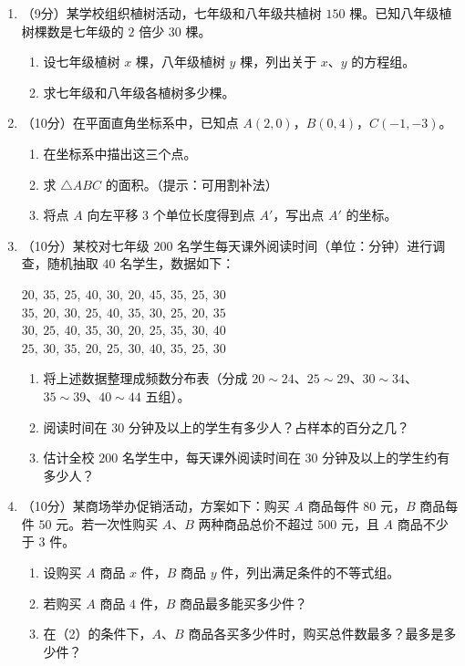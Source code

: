 \documentclass[12pt, a4paper]{ctexart}
\begin{document}
\begin{enumerate}[label=\textbf{\arabic*.}, leftmargin=2.5em, resume]
\item （9分）某学校组织植树活动，七年级和八年级共植树 $150$ 棵。已知八年级植树棵数是七年级的 $2$ 倍少 $30$ 棵。
\begin{enumerate}[label=(\arabic*), nosep]
\item 设七年级植树 $x$ 棵，八年级植树 $y$ 棵，列出关于 $x$、$y$ 的方程组。
\item 求七年级和八年级各植树多少棵。
\end{enumerate}
\vspace{6cm}

\item （10分）在平面直角坐标系中，已知点 $A(2, 0)$，$B(0, 4)$，$C(-1, -3)$。
\begin{enumerate}[label=(\arabic*), nosep]
\item 在坐标系中描出这三个点。
\item 求 $\triangle ABC$ 的面积。（提示：可用割补法）
\item 将点 $A$ 向左平移 $3$ 个单位长度得到点 $A'$，写出点 $A'$ 的坐标。
\end{enumerate}
\vspace{6cm}

\item （10分）某校对七年级 $200$ 名学生每天课外阅读时间（单位：分钟）进行调查，随机抽取 $40$ 名学生，数据如下：

\begin{center}
$20,\ 35,\ 25,\ 40,\ 30,\ 20,\ 45,\ 35,\ 25,\ 30$\\
$35,\ 20,\ 30,\ 25,\ 40,\ 35,\ 30,\ 25,\ 20,\ 35$\\
$30,\ 25,\ 40,\ 35,\ 30,\ 20,\ 25,\ 35,\ 30,\ 40$\\
$25,\ 30,\ 35,\ 20,\ 25,\ 30,\ 40,\ 35,\ 25,\ 30$
\end{center}

\begin{enumerate}[label=(\arabic*), nosep]
\item 将上述数据整理成频数分布表（分成 $20\sim24$、$25\sim29$、$30\sim34$、$35\sim39$、$40\sim44$ 五组）。
\item 阅读时间在 $30$ 分钟及以上的学生有多少人？占样本的百分之几？
\item 估计全校 $200$ 名学生中，每天课外阅读时间在 $30$ 分钟及以上的学生约有多少人？
\end{enumerate}
\vspace{6cm}

\item （10分）某商场举办促销活动，方案如下：购买 $A$ 商品每件 $80$ 元，$B$ 商品每件 $50$ 元。若一次性购买 $A$、$B$ 两种商品总价不超过 $500$ 元，且 $A$ 商品不少于 $3$ 件。
\begin{enumerate}[label=(\arabic*), nosep]
\item 设购买 $A$ 商品 $x$ 件，$B$ 商品 $y$ 件，列出满足条件的不等式组。
\item 若购买 $A$ 商品 $4$ 件，$B$ 商品最多能买多少件？
\item 在（2）的条件下，$A$、$B$ 商品各买多少件时，购买总件数最多？最多是多少件？
\end{enumerate}
\vspace{6cm}

\end{enumerate}
\end{document}
